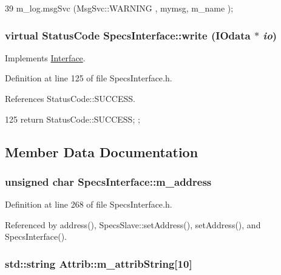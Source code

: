 \begin{DoxyCode}
39 { m_log.msgSvc (MsgSvc::WARNING , mymsg, m_name ); }
\end{DoxyCode}
\hypertarget{classSpecsInterface_a33c7224b61bbb8d1ef20680f570ba4bd}{
\subsubsection[{write}]{\setlength{\rightskip}{0pt plus 5cm}virtual {\bf StatusCode} SpecsInterface::write ({\bf IOdata} $\ast$ {\em io})}}
\label{classSpecsInterface_a33c7224b61bbb8d1ef20680f570ba4bd}


Implements \hyperlink{classInterface_ad665cacbaf490a26c1c4ba192022e68a}{Interface}.

Definition at line 125 of file SpecsInterface.h.

References StatusCode::SUCCESS.


\begin{DoxyCode}
125 { return StatusCode::SUCCESS; };
\end{DoxyCode}


\subsection{Member Data Documentation}
\hypertarget{classSpecsInterface_a4064da5ca6e0a172363967c4acc0b365}{
\subsubsection[{m\_\-address}]{\setlength{\rightskip}{0pt plus 5cm}unsigned char {\bf SpecsInterface::m\_\-address}}}
\label{classSpecsInterface_a4064da5ca6e0a172363967c4acc0b365}


Definition at line 268 of file SpecsInterface.h.

Referenced by address(), SpecsSlave::setAddress(), setAddress(), and SpecsInterface().\hypertarget{classAttrib_a3414521d7a82476e874b25a5407b5e63}{
\subsubsection[{m\_\-attribString}]{\setlength{\rightskip}{0pt plus 5cm}std::string {\bf Attrib::m\_\-attribString}\mbox{[}10\mbox{]}}}
\label{classAttrib_a3414521d7a82476e874b25a5407b5e63}


